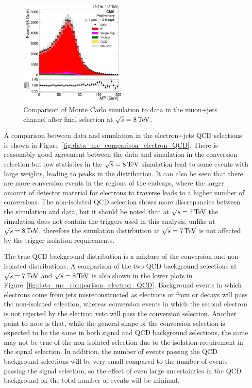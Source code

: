\begin{figure}[hbtp]
     \includegraphics[width=0.48\textwidth]{Chapters/04_Analysis/04b_XSections/images/control_plots/before_fit/8TeV/MuPlusJets_patType1CorrectedPFMet_MT_2orMoreBtags_with_ratio.pdf}\hfill
     \caption{Comparison of Monte Carlo simulation to data in the muon+jets channel after final
     selection at $\sqrt{s}=8\,\text{Te\hspace{-.08em}V}$.}
     \label{fig:data_mc_comparison_8TeV_muon}
\end{figure}

A comparison between data and simulation in the electron+jets QCD selections is shown in
Figure~\ref{fig:data_mc_comparison_electron_QCD}. There is reasonably good agreement between the data and
simulation in the conversion selection but low statistics in the $\sqrt{s}=8\,\text{Te\hspace{-.08em}V}$ simulation lead to some
events with large weights, leading to peaks in the distribution. It can also be seen that there are more
conversion events in the regions of the endcaps, where the larger amount of detector material for electrons to
traverse leads to a higher number of conversions. The non-isolated QCD selection shows more discrepancies
between the simulation and data, but it should be noted that at $\sqrt{s}=7\,\text{Te\hspace{-.08em}V}$ the simulation does not
contain the triggers used in this analysis, unlike at $\sqrt{s}=8\,\text{Te\hspace{-.08em}V}$, therefore the simulation distirbution
at $\sqrt{s}=7\,\text{Te\hspace{-.08em}V}$ is not affected by the trigger isolation requirements.

The true QCD background distribution is a mixture of the conversion and non-isolated distributions. A
comparison of the two QCD background selections at $\sqrt{s}=7\,\text{Te\hspace{-.08em}V}$ and $\sqrt{s}=8\,\text{Te\hspace{-.08em}V}$ is also shown in the
lower plots in Figure~\ref{fig:data_mc_comparison_electron_QCD}. Background events in which electrons come
from jets misreconstructed as electrons or from \bquark or \cquark decays will pass the non-isolated
selection, whereas conversion events in which the second electron is not rejected by the electron veto will
pass the conversion selection. Another point to note is that, while the general shape of the conversion
selection is expected to be the same in both signal and QCD background selections, the same may not be true of
the non-isolated selection due to the isolation requirement in the signal selection. In addition, the number
of events passing the QCD background selections will be very small compared to the number of events passing
the signal selection, so the effect of even large uncertainties in the QCD background on the total number of
events will be minimal.

